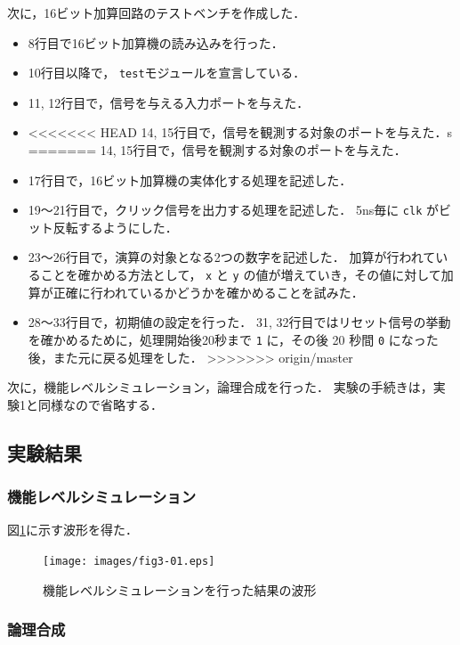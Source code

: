 \documentclass[uplatex]{jsarticle}
\begin{document}
次に，16ビット加算回路のテストベンチを作成した．

\begin{itemize}
  \item 
    8行目で16ビット加算機の読み込みを行った．
  \item 
    10行目以降で， {\tt test}モジュールを宣言している．
  \item 
    11, 12行目で，信号を与える入力ポートを与えた．
  \item 
<<<<<<< HEAD
    14, 15行目で，信号を観測する対象のポートを与えた．s
=======
    14, 15行目で，信号を観測する対象のポートを与えた．
  \item
    17行目で，16ビット加算機の実体化する処理を記述した．
  \item
    19〜21行目で，クリック信号を出力する処理を記述した．
    5ns毎に {\tt clk} がビット反転するようにした．
  \item
    23〜26行目で，演算の対象となる2つの数字を記述した．
    加算が行われていることを確かめる方法として， {\tt x} と {\tt y} の値が増えていき，その値に対して加算が正確に行われているかどうかを確かめることを試みた．
  \item
    28〜33行目で，初期値の設定を行った．
    31, 32行目ではリセット信号の挙動を確かめるために，処理開始後20秒まで {\tt 1} に，その後 20 秒間 {\tt 0} になった後，また元に戻る処理をした．  
>>>>>>> origin/master
\end{itemize}

次に，機能レベルシミュレーション，論理合成を行った．
実験の手続きは，実験1と同様なので省略する．

\subsection{実験結果}

\subsubsection{機能レベルシミュレーション}

図\ref{fig:3-01}に示す波形を得た．

\begin{figure}[htb]
  \begin{center}
    \texttt{[image: images/fig3-01.eps]}
    \caption{機能レベルシミュレーションを行った結果の波形}
    \label{fig:3-01}
  \end{center}
\end{figure}

\subsubsection{論理合成}
\end{document}
